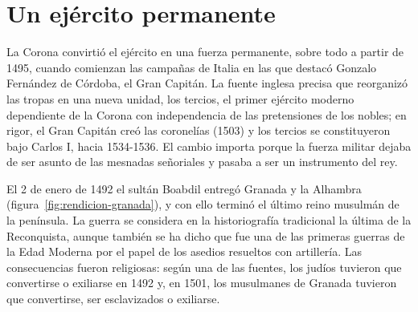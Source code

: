 \documentclass{book}
\begin{document}

\section{Un ejército permanente}

La Corona convirtió el ejército en una fuerza permanente, sobre todo a partir de 1495, cuando comienzan las campañas de Italia en las que destacó Gonzalo Fernández de Córdoba, el Gran Capitán. La fuente inglesa precisa que reorganizó las tropas en una nueva unidad, los tercios, el primer ejército moderno dependiente de la Corona con independencia de las pretensiones de los nobles; en rigor, el Gran Capitán creó las coronelías (1503) y los tercios se constituyeron bajo Carlos I, hacia 1534-1536. El cambio importa porque la fuerza militar dejaba de ser asunto de las mesnadas señoriales y pasaba a ser un instrumento del rey.


El 2 de enero de 1492 el sultán Boabdil entregó Granada y la Alhambra (figura~\ref{fig:rendicion-granada}), y con ello terminó el último reino musulmán de la península. La guerra se considera en la historiografía tradicional la última de la Reconquista, aunque también se ha dicho que fue una de las primeras guerras de la Edad Moderna por el papel de los asedios resueltos con artillería. Las consecuencias fueron religiosas: según una de las fuentes, los judíos tuvieron que convertirse o exiliarse en 1492 y, en 1501, los musulmanes de Granada tuvieron que convertirse, ser esclavizados o exiliarse.

\end{document}
